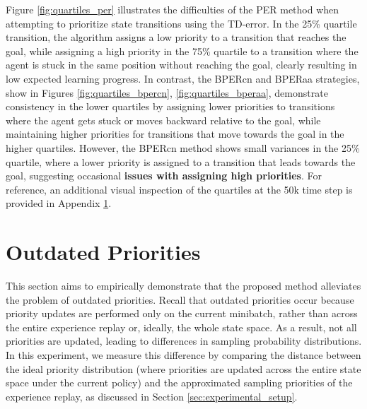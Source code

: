 Figure \ref{fig:quartiles_per} illustrates the difficulties of the PER method when attempting to prioritize state transitions using the TD-error. In the 25\% quartile transition, the algorithm assigns a low priority to a transition that reaches the goal, while assigning a high priority in the 75\% quartile to a transition where the agent is stuck in the same position without reaching the goal, clearly resulting in low expected learning progress. In contrast, the BPERcn and BPERaa strategies, show in Figures \ref{fig:quartiles_bpercn}, \ref{fig:quartiles_bperaa}, demonstrate consistency in the lower quartiles by assigning lower priorities to transitions where the agent gets stuck or moves backward relative to the goal, while maintaining higher priorities for transitions that move towards the goal in the higher quartiles. However, the BPERcn method shows small variances in the 25\% quartile, where a lower priority is assigned to a transition that leads towards the goal, suggesting occasional \textbf{issues with assigning high priorities}. For reference, an additional visual inspection of the quartiles at the 50k time step is provided in Appendix \ref{}.





\section{Outdated Priorities}

This section aims to empirically demonstrate that the proposed method alleviates the problem of outdated priorities. Recall that outdated priorities occur because priority updates are performed only on the current minibatch, rather than across the entire experience replay or, ideally, the whole state space. As a result, not all priorities are updated, leading to differences in sampling probability distributions. In this experiment, we measure this difference by comparing the distance between the ideal priority distribution (where priorities are updated across the entire state space under the current policy) and the approximated sampling priorities of the experience replay, as discussed in Section \ref{sec:experimental_setup}.

